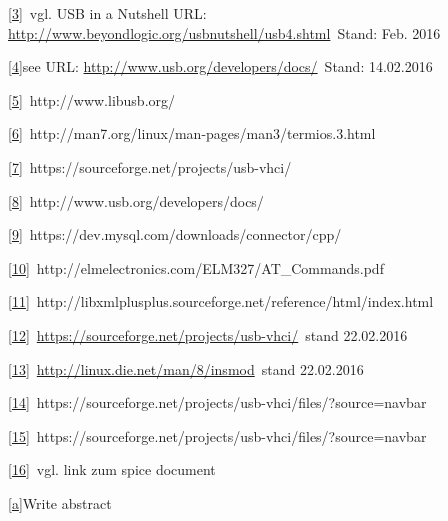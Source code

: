 \protect\hyperlink{ftntux5fref3}{{[}3{]}}{~vgl. USB in a Nutshell URL:
}{\href{https://www.google.com/url?q=http://www.beyondlogic.org/usbnutshell/usb4.shtml\&sa=D\&ust=1460827923757000\&usg=AFQjCNFllIVNcog2CsTPDWQSr9Zs2N-iww}{http://www.beyondlogic.org/usbnutshell/usb4.shtml}}{~Stand:
Feb. 2016}

\protect\hyperlink{ftntux5fref4}{{[}4{]}}{see URL:
}{\href{https://www.google.com/url?q=http://www.usb.org/developers/docs/\&sa=D\&ust=1460827923759000\&usg=AFQjCNHaPtIxFF98hmmxU-1fwdcMF5vqZA}{http://www.usb.org/developers/docs/}}{~Stand:
14.02.2016}

\protect\hyperlink{ftntux5fref5}{{[}5{]}}{~http://www.libusb.org/}

\protect\hyperlink{ftntux5fref6}{{[}6{]}}{~http://man7.org/linux/man-pages/man3/termios.3.html}

\protect\hyperlink{ftntux5fref7}{{[}7{]}}{~https://sourceforge.net/projects/usb-vhci/}

\protect\hyperlink{ftntux5fref8}{{[}8{]}}{~http://www.usb.org/developers/docs/}

\protect\hyperlink{ftntux5fref9}{{[}9{]}}{~https://dev.mysql.com/downloads/connector/cpp/}

\protect\hyperlink{ftntux5fref10}{{[}10{]}}{~http://elmelectronics.com/ELM327/AT\_Commands.pdf}

\protect\hyperlink{ftntux5fref11}{{[}11{]}}{~http://libxmlplusplus.sourceforge.net/reference/html/index.html}

\protect\hyperlink{ftntux5fref12}{{[}12{]}}{~}{\href{https://www.google.com/url?q=https://sourceforge.net/projects/usb-vhci/\&sa=D\&ust=1460827923761000\&usg=AFQjCNEYf3zs9zmQHnlPkVsLeqw4mINQYQ}{https://sourceforge.net/projects/usb-vhci/}}{~stand
22.02.2016}

\protect\hyperlink{ftntux5fref13}{{[}13{]}}{~}{\href{https://www.google.com/url?q=http://linux.die.net/man/8/insmod\&sa=D\&ust=1460827923761000\&usg=AFQjCNGeB1IWdK3zghqXBgFULixNgKXhJw}{http://linux.die.net/man/8/insmod}}{~stand
22.02.2016}

\protect\hyperlink{ftntux5fref14}{{[}14{]}}{~https://sourceforge.net/projects/usb-vhci/files/?source=navbar}

\protect\hyperlink{ftntux5fref15}{{[}15{]}}{~https://sourceforge.net/projects/usb-vhci/files/?source=navbar}

\protect\hyperlink{ftntux5fref16}{{[}16{]}}{~vgl. link zum spice
document}

\protect\hyperlink{cmntux5fref1}{{[}a{]}}{Write abstract}


